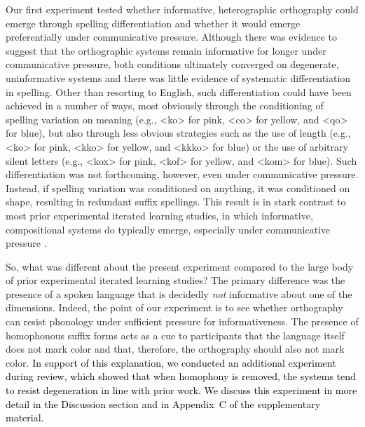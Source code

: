 \documentclass[doc,biblatex]{apa7}
\newcommand\newmaterial[1]{\textcolor{black}{#1}}
\begin{document}
Our first experiment tested whether informative, heterographic orthography could emerge through spelling differentiation and whether it would emerge preferentially under communicative pressure. Although there was evidence to suggest that the orthographic systems remain informative for longer under communicative pressure, both conditions ultimately converged on degenerate, uninformative systems and there was little evidence of systematic differentiation in spelling. Other than resorting to English, such differentiation could have been achieved in a number of ways, most obviously through the conditioning of spelling variation on meaning (e.g., <ko> for pink, <co> for yellow, and <qo> for blue), but also through less obvious strategies such as the use of length (e.g., <ko> for pink, <kko> for yellow, and <kkko> for blue) or the use of arbitrary silent letters (e.g., <kox> for pink, <kof> for yellow, and <kom> for blue). Such differentiation was not forthcoming, however, even under communicative pressure. Instead, if spelling variation was conditioned on anything, it was conditioned on shape, resulting in redundant suffix spellings. This result is in stark contrast to most prior experimental iterated learning studies, in which informative, compositional systems do typically emerge, especially under communicative pressure \parencite[e.g.,][]{Kirby:2015}.

So, what was different about the present experiment compared to the large body of prior experimental iterated learning studies? The primary difference was the presence of a spoken language that is decidedly \textit{not} informative about one of the dimensions. Indeed, the point of our experiment is to see whether orthography can resist phonology under sufficient pressure for informativeness. The presence of homophonous suffix forms acts as a cue to participants that the language itself does not mark color and that, therefore, the orthography should also not mark color. \newmaterial{In support of this explanation, we conducted an additional experiment during review, which showed that when homophony is removed, the systems tend to resist degeneration in line with prior work. We discuss this experiment in more detail in the Discussion section and in Appendix~C of the supplementary material.}
\end{document}
